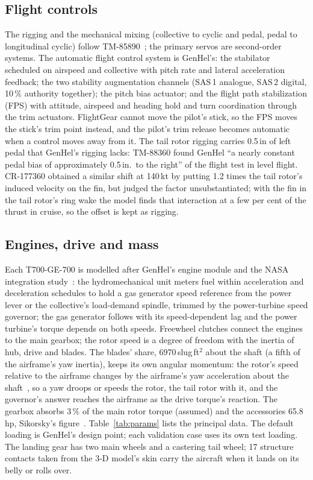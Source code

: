 \documentclass[10pt,a4paper,twocolumn]{article}
\begin{document}
\subsection{Flight controls}
The rigging and the mechanical mixing (collective to cyclic and pedal, pedal to longitudinal cyclic) follow TM-85890~\cite{hb}; the
primary servos are second-order systems. The automatic flight control system is GenHel's: the stabilator scheduled on airspeed and
collective with pitch rate and lateral acceleration feedback; the two stability augmentation channels (SAS\,1 analogue,
SAS\,2 digital, 10\,\% authority together); the pitch bias actuator; and the flight path stabilization (FPS) with attitude,
airspeed and heading hold and turn coordination through the trim actuators. FlightGear cannot move the pilot's stick, so the
FPS moves the stick's trim point instead, and the pilot's trim release becomes automatic when a control moves away from it.
The tail rotor rigging carries 0.5\,in of left pedal that GenHel's rigging lacks: TM-88360 found GenHel ``a nearly constant pedal bias of
approximately 0.5\,in.\ to the right'' of the flight test in level flight. CR-177360 obtained a similar shift at 140\,kt by putting
1.2 times the tail rotor's induced velocity on the fin, but judged the factor unsubstantiated; with the fin in the tail rotor's ring wake the
model finds that interaction at a few per cent of the thrust in cruise, so the offset is kept as rigging.

\subsection{Engines, drive and mass}
Each T700-GE-700 is modelled after GenHel's engine module and the NASA integration study~\cite{t700}: the hydromechanical
unit meters fuel within acceleration and deceleration schedules to hold a gas generator speed reference from the power lever or the
collective's load-demand spindle, trimmed by the power-turbine speed governor; the gas generator follows with its speed-dependent
lag and the power turbine's torque depends on both speeds. Freewheel clutches connect the engines to the main gearbox; the rotor speed
is a degree of freedom with the inertia of hub, drive and blades. The blades' share, 6970\,slug\,ft$^2$ about the shaft (a fifth of the
airframe's yaw inertia), keeps its own angular momentum: the rotor's speed relative to the airframe changes by the airframe's yaw
acceleration about the shaft~\cite{flet}, so a yaw droops or speeds the rotor, the tail rotor with it, and the governor's answer reaches the
airframe as the drive torque's reaction. The gearbox absorbs 3\,\% of the main rotor torque (assumed) and the
accessories 65.8\,hp, Sikorsky's figure~\cite{perf}. Table~\ref{tab:params} lists the principal data. The default loading is
GenHel's design point; each validation case uses its own test loading. The landing gear has two main wheels and a castering tail
wheel; 17 structure contacts taken from the 3-D model's skin carry the aircraft when it lands on its belly or rolls over.
\end{document}
